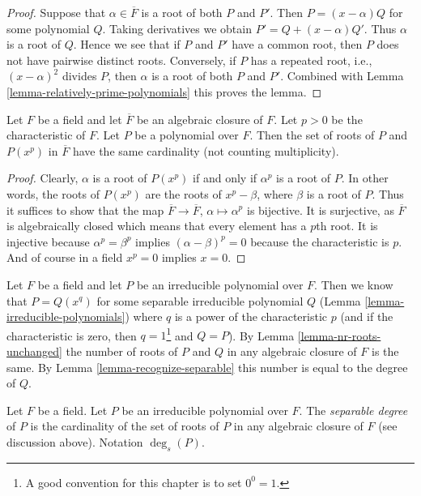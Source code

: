 \begin{proof}
Suppose that $\alpha \in \overline{F}$ is a root of both $P$ and $P'$.
Then $P = (x - \alpha)Q$ for some polynomial $Q$. Taking derivatives
we obtain $P' = Q + (x - \alpha)Q'$. Thus $\alpha$ is a root of $Q$.
Hence we see that if $P$ and $P'$ have a common root, then $P$
does not have pairwise distinct roots. Conversely, if $P$ has
a repeated root, i.e., $(x - \alpha)^2$ divides $P$, then $\alpha$
is a root of both $P$ and $P'$. Combined with
Lemma \ref{lemma-relatively-prime-polynomials} this proves the lemma.
\end{proof}

\begin{lemma}
\label{lemma-nr-roots-unchanged}
Let $F$ be a field and let $\overline{F}$ be an algebraic closure of $F$.
Let $p > 0$ be the characteristic of $F$. Let $P$ be a polynomial
over $F$. Then the set of roots of $P$ and $P(x^p)$ in $\overline{F}$
have the same cardinality (not counting multiplicity).
\end{lemma}

\begin{proof}
Clearly, $\alpha$ is a root of $P(x^p)$ if and only if $\alpha^p$ is a
root of $P$. In other words, the roots of $P(x^p)$ are the roots of
$x^p - \beta$, where $\beta$ is a root of $P$. Thus it suffices to show
that the map $\overline{F} \to \overline{F}$, $\alpha \mapsto \alpha^p$
is bijective. It is surjective, as $\overline{F}$ is algebraically closed
which means that every element has a $p$th root. It is injective because
$\alpha^p = \beta^p$ implies $(\alpha - \beta)^p = 0$ because
the characteristic is $p$. And of course in a field $x^p = 0$ implies
$x = 0$.
\end{proof}

\noindent
Let $F$ be a field and let $P$ be an irreducible polynomial over $F$.
Then we know that $P = Q(x^q)$ for some separable irreducible polynomial $Q$
(Lemma \ref{lemma-irreducible-polynomials}) where $q$ is a power of
the characteristic $p$ (and if the characteristic is zero, then
$q = 1$\footnote{A good convention for this chapter is to set $0^0 = 1$.}
and $Q = P$). By Lemma \ref{lemma-nr-roots-unchanged} the number of
roots of $P$ and $Q$ in any algebraic closure of $F$ is the same.
By Lemma \ref{lemma-recognize-separable} this number is equal to the degree
of $Q$.

\begin{definition}
\label{definition-separable-degree}
Let $F$ be a field. Let $P$ be an irreducible polynomial over $F$.
The {\it separable degree} of $P$ is the cardinality of the
set of roots of $P$ in any algebraic closure of $F$ (see discussion
above). Notation $\deg_s(P)$.
\end{definition}

